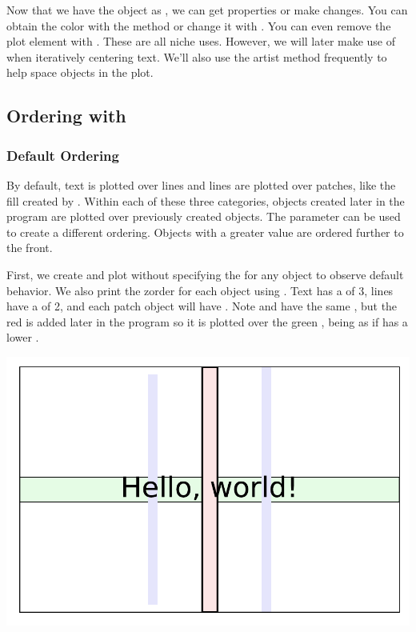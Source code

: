 Now that we have the object as , we can get properties or make changes. You can obtain the color with the  method or change it with . You can even remove the plot element with . These are all niche uses. However, we will later make use of  when iteratively centering text. We'll also use the  artist method frequently to help space objects in the plot. 


\subsection{Ordering with }

\subsubsection{Default Ordering}
By default, text is plotted over lines and lines are plotted over patches, like the fill created by . Within each of these three categories, objects created later in the program are plotted over previously created objects. The  parameter can be used to create a different ordering. Objects with a greater  value are ordered further to the front. 

First, we create and plot without specifying the  for any object to observe default behavior. We also print the zorder for each object using . Text has a  of 3, lines have a  of 2, and each patch object will have . Note  and  have the same , but the red  is added later in the program so it is plotted over the green , being as if  has a lower . 



\begin{center}
    \includegraphics[width = .7\textwidth]{figures/proseplots/default-z.pdf}
\end{center}


